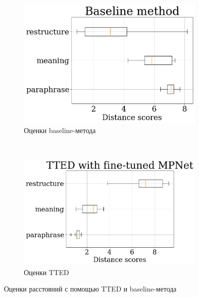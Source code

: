 \documentclass[12pt]{article}
\begin{document}
\begin{figure}[h]
\begin{subfigure}{.45\textwidth}
    \centering
    \includegraphics[width=\linewidth]{img/baseline_results.png}
    \caption{Оценки baseline-метода}
    \label{fig:baseline}
\end{subfigure}~
\begin{subfigure}{.5\textwidth}
    \centering
    \includegraphics[width=\linewidth]{img/paraphrase_mpnet_results.png}
    \caption{Оценки TTED}
    \label{fig:results}
\end{subfigure}
\caption{Оценки расстояний с помощью TTED и baseline-метода}
\end{figure}
\end{document}
